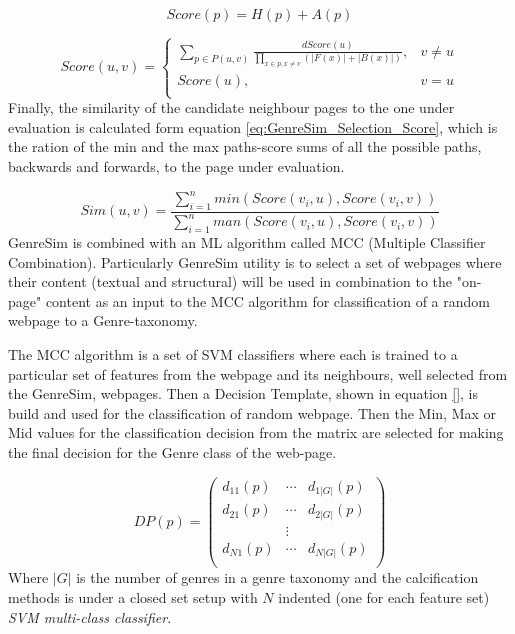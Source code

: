 \begin{equation}\label{eq:GenreSim_Score}
	Score(p) = H(p) + A(p)
\end{equation}

\begin{equation}\label{eq:GenreSim_Path}
	Score(u, v) =
      \begin{cases}
      	\sum_{p \in P(u, v)} \frac{d Score(u)}{\prod_{x \in p, x  \neq v} (|F(x)| +|B(x)|)}, & v \neq u \\
        Score(u), & v = u \\ 
       \end{cases}
\end{equation}
Finally, the similarity of the candidate neighbour pages to the one under evaluation is calculated form equation \ref{eq:GenreSim_Selection_Score}, which is the ration of the min and the max paths-score sums of all the possible paths, backwards and forwards, to the page under evaluation.

\begin{equation}\label{eq:GenreSim_Selection_Score}
	Sim(u, v) = \frac{\sum_{i=1}^{n} min(Score(v_{i}, u), Score(v_{i}, v))}{\sum_{i=1}^{n} man(Score(v_{i}, u), Score(v_{i}, v))}
\end{equation}
GenreSim is combined with an ML algorithm called MCC (Multiple Classifier Combination). Particularly GenreSim utility is to select a set of webpages where their content (textual and structural) will be used in combination to the "on-page" content as an input to the MCC algorithm for classification of a random webpage to a Genre-taxonomy.

The MCC algorithm is a set of SVM classifiers where each is trained to a particular set of features from the webpage and its neighbours, well selected from the GenreSim, webpages. Then a Decision Template, shown in equation \ref{}, is build and used for the classification of random webpage. Then the Min, Max or Mid values for the classification decision from the matrix are selected for making the final decision for the Genre class of the web-page.

\begin{equation}\label{eq:GenreSim_DP}
	DP(p) = \left(
    	\begin{array}{ccc}
        	d_{11} (p) & \cdots & d_{1|G|} (p) \\
            d_{21} (p) & \cdots  & d_{2|G|} (p) \\
            & \vdots & \\
            d_{N1} (p) & \cdots  & d_{N|G|} (p) \\
         \end{array}
\right)
\end{equation}
Where $|G|$ is the number of genres in a genre taxonomy and the calcification methods is under a closed set setup with $N$ indented (one for each feature set) \textit{SVM multi-class classifier}. 

